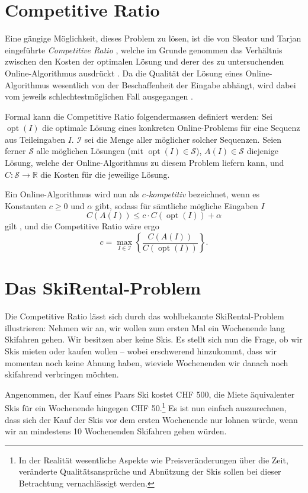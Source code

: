 \documentclass[11pt]{scrreprt} %
\theoremstyle{definition}
\begin{document}
\section{Competitive Ratio}

Eine gängige Möglichkeit, dieses Problem zu lösen, ist die von Sleator und Tarjan eingeführte {\it Competitive Ratio} \cite{Sleator, BKK}, welche im Grunde genommen das Verhältnis zwischen den Kosten der optimalen Lösung und derer des zu untersuchenden Online-Algorithmus ausdrückt \cite{BKK}. Da die Qualität der Lösung eines Online-Algorithmus wesentlich von der Beschaffenheit der Eingabe abhängt, wird dabei vom jeweils schlechtestmöglichen Fall ausgegangen \cite{Trevisan}.

\bigskip
Formal kann die Competitive Ratio folgendermassen definiert werden: Sei $\operatorname{opt}(I)$ die optimale Lösung eines konkreten Online-Problems für eine Sequenz aus Teileingaben $I$. $\mathcal{I}$ sei die Menge aller möglicher solcher Sequenzen. Seien ferner $\mathcal{S}$ alle möglichen Lösungen (mit $\operatorname{opt}(I) \in \mathcal{S}$), $A(I) \in \mathcal{S}$ diejenige Lösung, welche der Online-Algorithmus zu diesem Problem liefern kann, und $C : \mathcal{S} \rightarrow \mathbb{R}$ die Kosten für die jeweilige Lösung.

\bigskip
Ein Online-Algorithmus wird nun als {\it $c$-kompetitiv} bezeichnet, wenn es Konstanten $c \ge 0$ und $\alpha$ gibt, sodass für sämtliche mögliche Eingaben $I$
\[
C(A(I)) \le c\cdot C(\operatorname{opt}(I)) + \alpha
\]
gilt \cite{BKK}, und die Competitive Ratio wäre ergo
\[
c = \max_{I \in \mathcal{I}} \left\{ \frac {C(A(I))}{C(\operatorname{opt}(I))} \right\}.
\]

\section{Das {\sc SkiRental}-Problem}

Die Competitive Ratio lässt sich durch das wohlbekannte {\sc SkiRental}-Problem illustrieren: Nehmen wir an, wir wollen zum ersten Mal ein Wochenende lang Skifahren gehen. Wir besitzen aber keine Skis. Es stellt sich nun die Frage, ob wir Skis mieten oder kaufen wollen -- wobei erschwerend hinzukommt, dass wir momentan noch keine Ahnung haben, wieviele Wochenenden wir danach noch skifahrend verbringen möchten.

Angenommen, der Kauf eines Paars Ski kostet CHF 500, die Miete äquivalenter Skis für ein Wochenende hingegen CHF 50.\footnote{In der Realität wesentliche Aspekte wie Preisveränderungen über die Zeit, veränderte Qualitätsansprüche und Abnützung der Skis sollen bei dieser Betrachtung vernachlässigt werden.} Es ist nun einfach auszurechnen, dass sich der Kauf der Skis vor dem ersten Wochenende nur lohnen würde, wenn wir an mindestens 10 Wochenenden Skifahren gehen würden.
\end{document}
